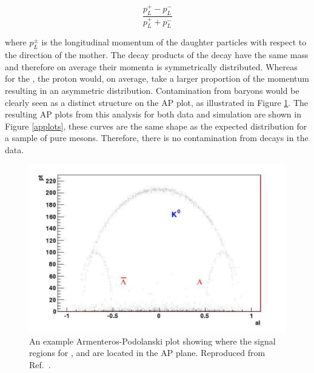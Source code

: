 \begin{equation}
\frac{p_L^+ - p_L^-}{p_L^+ + p_L^-}
\label{longitudinalpasy}
\end{equation}

where $p_L^{\pm}$ is the longitudinal momentum of the daughter particles with respect to the direction of the mother. The decay products of the \decay{\KS}{\pip\pim} decay have the same mass and therefore on average their momenta is symmetrically distributed. Whereas for the \decay{\Lz}{\proton\pim}, the proton would, on average, take a larger proportion of the momentum resulting in an asymmetric distribution. Contamination from \Lz baryons would be clearly seen as a distinct structure on the AP plot, as illustrated in Figure \ref{apexample}. The resulting AP plots from this analysis for both data and simulation are shown in Figure \ref{applots}, these curves are the same shape as the expected distribution for a sample of pure \KS mesons. Therefore, there is no contamination from \decay{\Lz}{\proton\pim} decays in the data.

\begin{figure}
\centering
\includegraphics[width=0.5\linewidth]{figures/backgrounds/APfromPaper.pdf}
\caption{An example Armenteros-Podolanski plot showing where the signal regions for \KS, \Lz and \Lbar are located in the AP plane. Reproduced from Ref.~\cite{APplot}.}
\label{apexample}
\end{figure}

